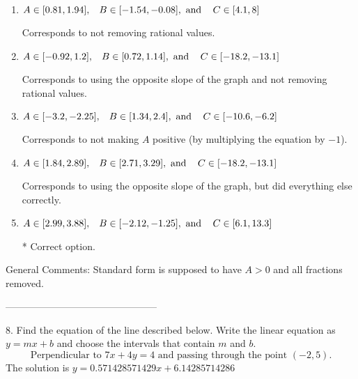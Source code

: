 \documentclass{article}[10pt]
\begin{document}
\begin{enumerate}[label=\Alph*.] 
\item $ A \in [0.81, 1.94], \hspace{3mm} B \in [-1.54, -0.08], \text{ and } \hspace{3mm} C \in [4.1, 8] $ 

  Corresponds to not removing rational values. 
\item $ A \in [-0.92, 1.2], \hspace{3mm} B \in [0.72, 1.14], \text{ and } \hspace{3mm} C \in [-18.2, -13.1] $ 

  Corresponds to using the opposite slope of the graph and not removing rational values. 
\item $ A \in [-3.2, -2.25], \hspace{3mm} B \in [1.34, 2.4], \text{ and } \hspace{3mm} C \in [-10.6, -6.2] $ 

  Corresponds to not making $A$ positive (by multiplying the equation by $-1$). 
\item $ A \in [1.84, 2.89], \hspace{3mm} B \in [2.71, 3.29], \text{ and } \hspace{3mm} C \in [-18.2, -13.1] $ 

  Corresponds to using the opposite slope of the graph, but did everything else correctly. 
\item $ A \in [2.99, 3.88], \hspace{3mm} B \in [-2.12, -1.25], \text{ and } \hspace{3mm} C \in [6.1, 13.3] $ 

 * Correct option. 
\end{enumerate} 
 
General Comments: Standard form is supposed to have $A > 0$ and all fractions removed.

-----------------------------------------------

8. Find the equation of the line described below. Write the linear equation as $ y=mx+b $ and choose the intervals that contain $m$ and $b$.
$$ \text{Perpendicular to } 7 x + 4 y = 4 \text{ and passing through the point } (-2, 5). $$ 
The solution is $ y = 0.571428571429 x + 6.14285714286 $ 
\end{document}
